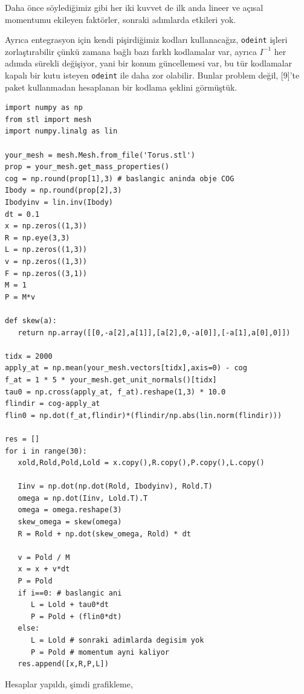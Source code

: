 \documentclass[12pt,fleqn]{article}\usepackage{../../common}
\begin{document}
Daha önce söylediğimiz gibi her iki kuvvet de ilk anda lineer ve açısal
momentumu ekileyen faktörler, sonraki adımlarda etkileri yok.

Ayrıca entegrasyon için kendi pişirdiğimiz kodları kullanacağız, \verb!odeint!
işleri zorlaştırabilir çünkü zamana bağlı bazı farklı kodlamalar var, ayrıca
$I^{-1}$ her adımda sürekli değişiyor, yani bir konum güncellemesi var, bu
tür kodlamalar kapalı bir kutu isteyen \verb!odeint! ile daha zor olabilir.
Bunlar problem değil, [9]'te paket kullanmadan hesaplanan bir
kodlama şeklini görmüştük.

\begin{verbatim}
import numpy as np
from stl import mesh
import numpy.linalg as lin

your_mesh = mesh.Mesh.from_file('Torus.stl')   
prop = your_mesh.get_mass_properties()
cog = np.round(prop[1],3) # baslangic aninda obje COG
Ibody = np.round(prop[2],3)
Ibodyinv = lin.inv(Ibody)
dt = 0.1
x = np.zeros((1,3))
R = np.eye(3,3)
L = np.zeros((1,3))
v = np.zeros((1,3))
F = np.zeros((3,1))
M = 1
P = M*v

def skew(a):
   return np.array([[0,-a[2],a[1]],[a[2],0,-a[0]],[-a[1],a[0],0]])

tidx = 2000
apply_at = np.mean(your_mesh.vectors[tidx],axis=0) - cog
f_at = 1 * 5 * your_mesh.get_unit_normals()[tidx]
tau0 = np.cross(apply_at, f_at).reshape(1,3) * 10.0
flindir = cog-apply_at
flin0 = np.dot(f_at,flindir)*(flindir/np.abs(lin.norm(flindir)))

res = []
for i in range(30):
   xold,Rold,Pold,Lold = x.copy(),R.copy(),P.copy(),L.copy()
   
   Iinv = np.dot(np.dot(Rold, Ibodyinv), Rold.T)
   omega = np.dot(Iinv, Lold.T).T
   omega = omega.reshape(3)
   skew_omega = skew(omega)
   R = Rold + np.dot(skew_omega, Rold) * dt

   v = Pold / M
   x = x + v*dt
   P = Pold
   if i==0: # baslangic ani
      L = Lold + tau0*dt
      P = Pold + (flin0*dt)
   else:      
      L = Lold # sonraki adimlarda degisim yok
      P = Pold # momentum ayni kaliyor
   res.append([x,R,P,L])
\end{verbatim}

Hesaplar yapıldı, şimdi grafikleme,
\end{document}
